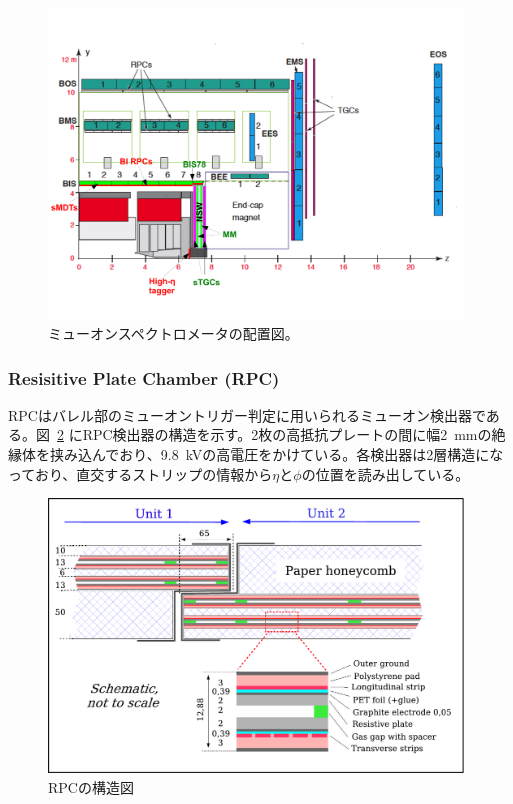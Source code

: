 \begin{figure}[tb]
  \centering
  \includegraphics[clip, width=11cm]{fig/2/ch01_fig_03a.pdf}
  \caption{ミューオンスペクトロメータの配置図。}
  \label{fig:ミューオン}
\end{figure}

\subsubsection{Resisitive Plate Chamber (RPC)}
RPCはバレル部のミューオントリガー判定に用いられるミューオン検出器である。図~\ref{fig:RPC} にRPC検出器の構造を示す。2枚の高抵抗プレートの間に幅2~mmの絶縁体を挟み込んでおり、9.8~kVの高電圧をかけている。各検出器は2層構造になっており、直交するストリップの情報から$\eta$と$\phi$の位置を読み出している。

\begin{figure}[tb]
  \centering
  \includegraphics[clip, width=11cm]{fig/2/RPC_structure.pdf}
  \caption{RPCの構造図}
  \label{fig:RPC}
\end{figure}

